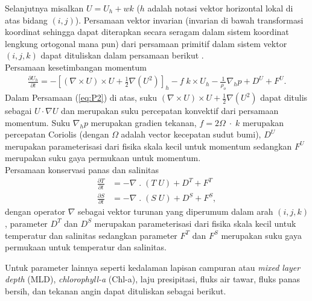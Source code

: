 \begin{spacing}{1.5}
	Selanjutnya misalkan $U = U_h + wk$ ($h$ adalah notasi vektor horizontal lokal di atas bidang $(i,j)$). Persamaan vektor invarian (invarian di bawah transformasi koordinat sehingga dapat diterapkan secara seragam dalam sistem koordinat lengkung ortogonal mana pun) dari persamaan primitif dalam sistem vektor $(i, j, k)$ dapat dituliskan dalam persamaan berikut .\\
	Persamaan kesetimbangan momentum
	\begin{equation}\label{eq:P2}
		\begin{aligned}
			\frac{\partial U_h}{\partial t} = - \left[(\nabla \times U) \times U + \frac{1}{2}\nabla (U^2)\right]_h - f \; k \times U_h - \frac{1}{\rho_o}\nabla_h p + D^U + F^U.
		\end{aligned}
	\end{equation}
	Dalam Persamaan (\ref{eq:P2}) di atas, suku $(\nabla \times U) \times U + \frac{1}{2}\nabla (U^2)$ dapat ditulis sebagai $U\cdot \nabla U$ dan merupakan suku percepatan konvektif dari persamaan momentum. Suku $\nabla_h p$ merupakan gradien tekanan, $f = 2\Omega\; \cdot \;k$ merupakan percepatan Coriolis (dengan $\Omega$ adalah vector kecepatan sudut bumi), $D^U$ merupakan parameterisasi dari fisika skala kecil untuk momentum sedangkan $F^U$ merupakan suku gaya permukaan untuk momentum.\\
	Persamaan konservasi panas dan salinitas
	\begin{equation}\label{eq:P3}
		\begin{aligned}
			\frac{\partial T}{\partial t} &= - \nabla \; . \; (T\;U)  + D^T + F^T \\
			\frac{\partial S}{\partial t} &= - \nabla \; . \; (S\;U)  + D^S + F^S,
		\end{aligned}
	\end{equation}
	dengan operator $\nabla$ sebagai vektor turunan yang diperumum dalam arah $(i,j,k)$, parameter $D^T$ dan $D^S$ merupakan parameterisasi dari fisika skala kecil untuk temperatur dan salinitas sedangkan parameter $F^T$ dan $F^S$ merupakan suku gaya permukaan untuk temperatur dan salinitas. 
	
	Untuk parameter lainnya seperti kedalaman lapisan campuran atau \textit{mixed layer depth} (MLD), \textit{chlorophyll-a} (Chl-a), laju presipitasi, fluks air tawar, fluks panas bersih, dan tekanan angin dapat dituliskan sebagai berikut.
	
	
\end{spacing}
\vspace{-1pc}
